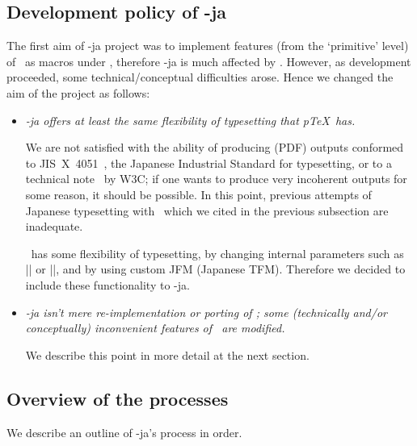 \documentclass{ajt}
\begin{document}
\subsection{Development policy of \LuaTeX-ja}
\label{ssec-pol} 
The first aim of \LuaTeX-ja project was to implement features (from the
`primitive' level) of \pTeX\ as macros under \LuaTeX, therefore \LuaTeX-ja is
much affected by \pTeX.  However, as development proceeded, some
technical/conceptual difficulties arose. Hence we changed the aim
of the project as follows:
\begin{itemize}
\item\emph{\LuaTeX-ja offers at least the same flexibility of
     typesetting that p\TeX\ has.}

     We are not satisfied with the ability of producing (PDF) outputs conformed to
     JIS~X~4051~\cite{jisx4051}, the Japanese Industrial Standard for
     typesetting, or to a technical note~\cite{w3c} by W3C;
     if one wants to produce very incoherent outputs for some reason, it
     should be possible.
In this point, previous attempts of Japanese typesetting with \LuaTeX\
     which we cited in the previous subsection are inadequate.

\pTeX\ has some flexibility of typesetting, by changing internal
     parameters such as |\kanjiskip| or |\prebreakpenalty|, and by using
     custom JFM (Japanese TFM). Therefore we decided to include these
     functionality to \LuaTeX-ja.

\item\emph{\LuaTeX-ja isn't mere re-implementation or porting of \pTeX;
     some (technically and/or conceptually) inconvenient features of
     \pTeX\ are modified.} 

     We describe this point in more detail at the next section.
\end{itemize}


\subsection{Overview of the processes}
\label{ssec-over}
We describe an outline of \LuaTeX-ja's process in order.
\end{document}
